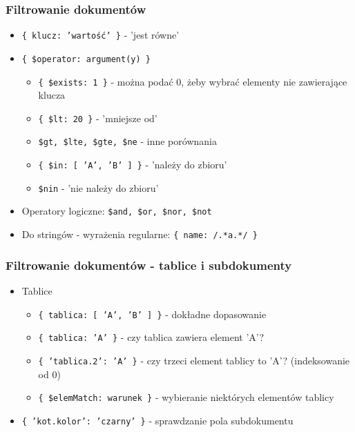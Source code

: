 \documentclass{beamer}
\begin{document}
  \begin{frame}
    \frametitle{Filtrowanie dokumentów}
    \begin{itemize}
      \item \texttt{\{ klucz: 'wartość' \}} - 'jest równe'
      \item \texttt{\{ \$operator: argument(y) \}}
      \begin{itemize}
        \item \texttt{\{ \$exists: 1 \}} - można podać 0, żeby wybrać elementy nie zawierające klucza
        \item \texttt{\{ \$lt: 20 \}} - 'mniejsze od'
        \item \texttt{\$gt, \$lte, \$gte, \$ne} - inne porównania
        \item \texttt{\{ \$in: [ 'A', 'B' ] \}} - 'należy do zbioru'
        \item \texttt{\$nin} - 'nie należy do zbioru'
      \end{itemize}
      \item Operatory logiczne: \texttt{\$and, \$or, \$nor, \$not}
      \item Do stringów - wyrażenia regularne: \texttt{\{ name: /.*a.*/ \}}
    \end{itemize}
    
  \end{frame}

  \begin{frame}
    \frametitle{Filtrowanie dokumentów - tablice i subdokumenty}
    \begin{itemize}
      \item Tablice
      \begin{itemize}
        \item \texttt{\{ tablica: [ 'A', 'B' ] \}} - dokładne dopasowanie
        \item \texttt{\{ tablica: 'A' \}} - czy tablica zawiera element 'A'?
        \item \texttt{\{ 'tablica.2': 'A' \}} - czy trzeci element tablicy to 'A'? (indeksowanie od 0)
        \item \texttt{\{ \$elemMatch: warunek \}} - wybieranie niektórych elementów tablicy
      \end{itemize}
      \item \texttt{\{ 'kot.kolor': 'czarny' \}} - sprawdzanie pola subdokumentu
      
    \end{itemize}
  \end{frame}
\end{document}
